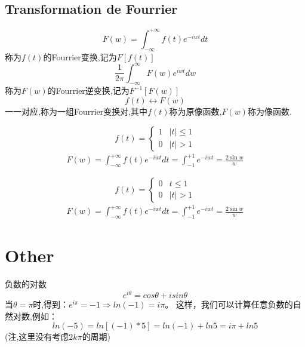 \subsection{Transformation de Fourrier}
$$F(w)=\int_{-\infty}^{+\infty}f(t)e^{-iwt}dt$$
称为$f(t)$的Fourrier变换,记为$F[f(t)]$
$$\frac{ 1}{2\pi}\int_{-\infty}^{\infty}F(w)e^{iwt}dw$$称为$F(w)$的Fourrier逆变换,记为$F^{-1}[F(w)]$
$$f(t) \longleftrightarrow F(w)$$一一对应,称为一组Fourrier变换对,其中$f(t)$称为原像函数,$F(w)$称为像函数.
\begin{example}
\begin{equation}
f(t)=
\left\{
		\begin{array}{ll}
			1 & |t| \leq 1 \\
			0 & |t| > 1
		\end{array}
		\right.
\end{equation}
\begin{eqnarray}
 F(w)=\int_{-\infty}^{+\infty} f(t)e^{-iwt}dt=\int_{-1}^{+1}e^{-iwt}=\frac{2\sin w}{w}
\end{eqnarray}
\end{example}

\begin{example}
\begin{equation}
f(t)=
\left\{
		\begin{array}{ll}
			0 & t \leq 1 \\
			0 & |t| > 1
		\end{array}
		\right.
\end{equation}
\begin{eqnarray}
 F(w)=\int_{-\infty}^{+\infty} f(t)e^{-iwt}dt=\int_{-1}^{+1}e^{-iwt}=\frac{2\sin w}{w}
\end{eqnarray}
\end{example}

\section{Other}
负数的对数
$$e^{i\theta}=cos\theta+isin\theta$$
当$\theta=\pi$时,得到：$e^{i\pi}=-1\Rightarrow ln(-1)=i\pi$。
这样，我们可以计算任意负数的自然对数,例如：
$$ln(-5)=ln[(-1)*5]=ln(-1)+ln5=i\pi+ln5$$
(注,这里没有考虑$2k\pi$的周期)


